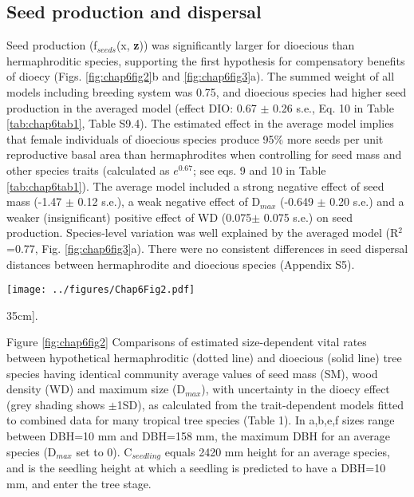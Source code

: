 \documentclass[b5paper,justified]{tufte-book} %
\begin{document}
\begin{fullwidth}
\subsection{Seed production and dispersal}
Seed production (f$_{seeds}$(x, \textbf{z})) was significantly larger for dioecious than hermaphroditic species, supporting the first hypothesis for compensatory benefits of dioecy (Figs. \ref{fig:chap6fig2}b and \ref{fig:chap6fig3}a). The summed weight of all models including breeding system was 0.75, and dioecious species had higher seed production in the averaged model (effect DIO: 0.67 $\pm$ 0.26 s.e., Eq. 10 in Table \ref{tab:chap6tab1}, Table S9.4). The estimated effect in the average model implies that female individuals of dioecious species produce 95\% more seeds per unit reproductive basal area than hermaphrodites when controlling for seed mass and other species traits (calculated as $e^{0.67}$; see eqs. 9 and 10 in Table \ref{tab:chap6tab1}). The average model included a strong negative effect of seed mass (-1.47 $\pm$ 0.12 s.e.), a weak negative effect of D$_{max}$ (-0.649 $\pm$ 0.20 s.e.) and a weaker (insignificant) positive effect of WD (0.075$\pm$ 0.075 s.e.) on seed production. Species-level variation was well explained by the averaged model (R$^2$=0.77, Fig. \ref{fig:chap6fig3}a). There were no consistent differences in seed dispersal distances between hermaphrodite and dioecious species (Appendix S5). 



\begin{landscape}
\begin{figure*}
\hspace*{4cm} \texttt{[image: ../figures/Chap6Fig2.pdf]}
\caption[The proportion of interspecific variation in various demographic rates explained by the four functional traits][35cm]{.}
\label{fig:chap6fig2}
\hspace*{4cm} \begin{minipage}{20cm}
\footnotesize Figure \ref{fig:chap6fig2} 
Comparisons of estimated size-dependent vital rates between hypothetical hermaphroditic (dotted line) and dioecious (solid line) tree species having identical community average values of seed mass (SM), wood density (WD) and maximum size (D$_{max}$), with uncertainty in the dioecy effect (grey shading shows $\pm$1SD), as calculated from the trait-dependent models fitted to combined data for many tropical tree species (Table 1). In a,b,e,f sizes range between DBH=10 mm and DBH=158 mm, the maximum DBH for an average species (D$_{max}$ set to 0). C$_{seedling}$ equals 2420 mm height for an average species, and is the seedling height at which a seedling is predicted to have a DBH=10 mm, and enter the tree stage.
\end{minipage}
\end{figure*}
\end{landscape}


\end{fullwidth}
\end{document}
